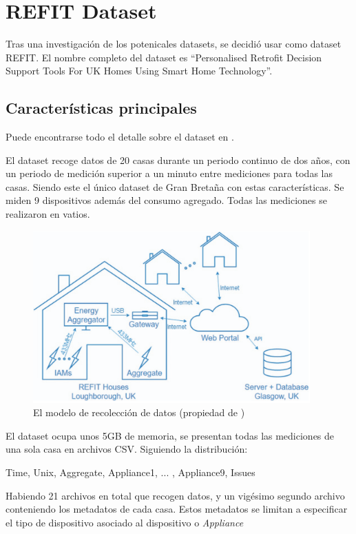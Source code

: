 \section{REFIT Dataset}
Tras una investigación de los potenicales datasets, se decidió usar como dataset REFIT. El nombre completo del dataset es \enquote{Personalised Retrofit Decision Support Tools For UK Homes Using Smart Home Technology}\autocite{REFIT}.
\subsection{Características principales}
Puede encontrarse todo el detalle sobre el dataset en \autocite{REFIT}.

El dataset recoge datos de 20 casas durante un periodo continuo de dos años, con un periodo de medición superior a un minuto entre mediciones para todas las casas. Siendo este el único dataset de Gran Bretaña con estas características.
Se miden 9 dispositivos además del consumo agregado. Todas las mediciones se realizaron en vatios. 

\begin{figure}[H]
    \centering
    \includegraphics[height=250px]{images/REFITmodeloDatos.png}
    \caption{El modelo de recolección de datos (propiedad de \autocite{REFIT})}
    \label{diagramaBBDD}
\end{figure}

El dataset ocupa unos 5GB de memoria, se presentan todas las mediciones de una sola casa en archivos CSV. Siguiendo la distribución:
\begin{center}
    Time, Unix, Aggregate, Appliance1, ... , Appliance9, Issues
\end{center}
Habiendo 21 archivos en total que recogen datos, y un vigésimo segundo archivo conteniendo los metadatos de cada casa. Estos metadatos se limitan a especificar el tipo de dispositivo asociado al dispositivo o \textit{Appliance} 

